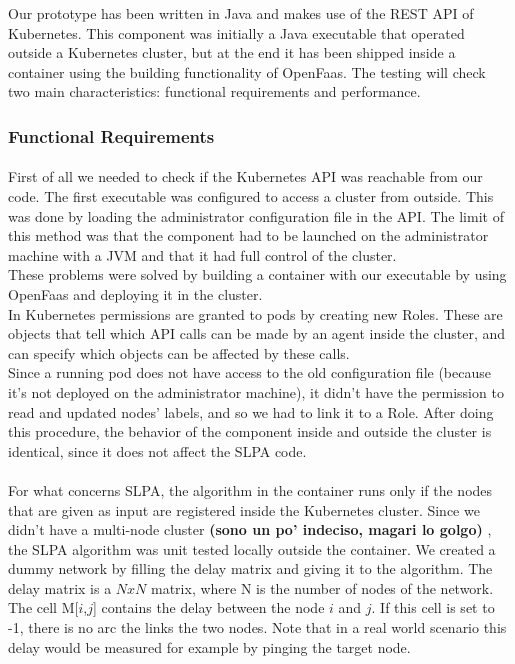 Our prototype has been written in Java and makes use of the REST API of Kubernetes. 
This component was initially a Java executable that operated outside a Kubernetes cluster,
but at the end it has been shipped inside a container using the building functionality of OpenFaas.
The testing will check two main characteristics: functional requirements and performance.  
\\
\subsubsection*{Functional Requirements}
\paragraph{}
First of all we needed to check if the Kubernetes API was reachable from our code.
The first executable was configured to access a cluster from outside. This was done by loading
the administrator configuration file in the API.
The limit of this method was that the component had to be launched on the administrator machine with a JVM
and that it had full control of the cluster. 
\\
These problems were solved by building a container with our executable by using OpenFaas and deploying it
in the cluster.
\\
In Kubernetes permissions are granted to pods by creating new Roles. These are objects that tell which API 
calls can be made by an agent inside the cluster, and can specify which objects can be affected by these calls.
\\
Since a running pod does not have access to the old configuration file (because it's not deployed on the administrator machine),
it didn't have the permission to read and updated nodes' labels, and so we had to link it to a Role.
After doing this procedure, the behavior of the component inside and outside the cluster is identical,
since it does not affect the SLPA code.
\paragraph{}
For what concerns SLPA, the algorithm in the container runs only if the nodes that
are given as input are registered inside the Kubernetes cluster.
Since we didn't have a multi-node cluster \textbf{(sono un po' indeciso, magari lo golgo)}
, the SLPA algorithm was unit tested locally outside the container.
We created a dummy network by filling the delay matrix and giving it to the algorithm.
The delay matrix is a  $NxN$ matrix, where N is the number of nodes of the network.
The cell M[$i$,$j$] contains the delay between the node $i$ and $j$. If this
cell is set to -1, there is no arc the links the two nodes. 
Note that in a real world scenario this delay would be measured for example by pinging the target node.







